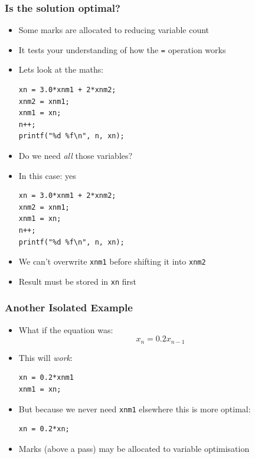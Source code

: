 \documentclass[14pt]{beamer}
\begin{document}
\begin{frame}[fragile]
\frametitle{Is the solution optimal?}
\begin{itemize}
\item Some marks are allocated to reducing variable count
\item It tests your understanding of how the \texttt{=} operation works
\item Lets look at the maths:
\begin{lstlisting}[style=CStyle]
xn = 3.0*xnm1 + 2*xnm2;
xnm2 = xnm1;
xnm1 = xn;
n++;
printf("%d %f\n", n, xn);
\end{lstlisting}
\item Do we need \textit{all} those variables?
\end{itemize}
\end{frame}

\begin{frame}[fragile]
\begin{itemize}
\item In this case: yes
\begin{lstlisting}[style=CStyle]
xn = 3.0*xnm1 + 2*xnm2;
xnm2 = xnm1;
xnm1 = xn;
n++;
printf("%d %f\n", n, xn);
\end{lstlisting}
\item We can't overwrite \texttt{xnm1} before shifting it into \texttt{xnm2}
\item Result must be stored in \texttt{xn} first
\end{itemize}
\end{frame}

\begin{frame}[fragile]
\frametitle{Another Isolated Example}
\begin{itemize}
\item What if the equation was:
\begin{equation*}
x_n = 0.2x_{n-1}
\end{equation*}
\item This will \textit{work}:

\begin{lstlisting}[style=CStyle]
xn = 0.2*xnm1
xnm1 = xn;
\end{lstlisting}

\item But because we never need \texttt{xnm1} elsewhere this is more optimal:
\begin{lstlisting}[style=CStyle]
xn = 0.2*xn;
\end{lstlisting}
\item Marks (above a pass) may be allocated to variable optimisation
\end{itemize}
\end{frame}
\end{document}
